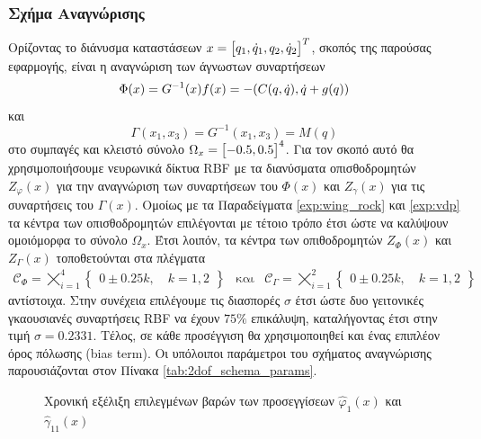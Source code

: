 {\subsubsection{Σχήμα Αναγνώρισης}
Ορίζοντας το διάνυσμα καταστάσεων $x = \bmqty{q_1,\dot q_1,q_2,\dot q_2 }^T$, σκοπός της παρούσας εφαρμογής, είναι η αναγνώριση των άγνωστων συναρτήσεων
\begin{equation*}
	\Phi(x) = G^{-1}(x) f(x) = -\pqty{C(q,\dot q),\dot q + g(q)}
\end{equation*}
και 
\begin{equation*}
\Gamma(x_1, x_3) = G^{-1}(x_1, x_3) = M(q)
\end{equation*}
στο συμπαγές και κλειστό σύνολο $\Omega_x =\bmqty{-0.5,0.5}^4$. Για τον σκοπό αυτό θα χρησιμοποιήσουμε νευρωνικά δίκτυα RBF με τα  διανύσματα οπισθοδρομητών $Z_\varphi(x)$ για την αναγνώριση των συναρτήσεων του $\Phi(x)$ και $Z_\gamma(x)$ για τις συναρτήσεις του $\Gamma(x)$. Ομοίως με τα Παραδείγματα \ref{exp:wing_rock} και \ref{exp:vdp} τα κέντρα των οπισθοδρομητών επιλέγονται με τέτοιο τρόπο έτσι ώστε να καλύψουν ομοιόμορφα το σύνολο $\Omega_x$. Έτσι λοιπόν, τα κέντρα των οπιθοδρομητών $Z_\Phi(x)$ και $Z_\Gamma(x)$ τοποθετούνται στα πλέγματα
\begin{equation*}
\begin{matrix}
	\mathcal{C}_\Phi = \bigtimes\limits_{i=1}^{4}  \begin{Bmatrix}
	0 \pm  0.25 k, \quad  k = 1,2
	\end{Bmatrix}
&
\text{και}
&
\mathcal{C}_\Gamma = \bigtimes\limits_{i=1}^{2}  \begin{Bmatrix}
0 \pm  0.25 k, \quad  k = 1,2
\end{Bmatrix}
\end{matrix}
\end{equation*} 
αντίστοιχα. Στην συνέχεια επιλέγουμε τις διασπορές $\sigma$ έτσι ώστε δυο γειτονικές γκαουσιανές συναρτήσεις RBF να έχουν $75\%$ επικάλυψη, καταλήγοντας έτσι στην τιμή $\sigma = 0.2331$. Τέλος, σε κάθε προσέγγιση θα χρησιμοποιηθεί και ένας επιπλέον όρος πόλωσης (bias term). Οι υπόλοιποι παράμετροι του σχήματος αναγνώρισης παρουσιάζονται στον Πίνακα \ref{tab:2dof_schema_params}.

}

\begin{figure}
	\begin{subfigure}{0.5\textwidth}
		
	\end{subfigure}
	\begin{subfigure}{0.5\textwidth}
		
	\end{subfigure}
	\caption{Χρονική εξέλιξη επιλεγμένων βαρών των προσεγγίσεων $\hat{\varphi}_1(x)$ και $\hat{\gamma}_{11}(x)$}
	\label{fig:2dof_w_conv}
\end{figure}

